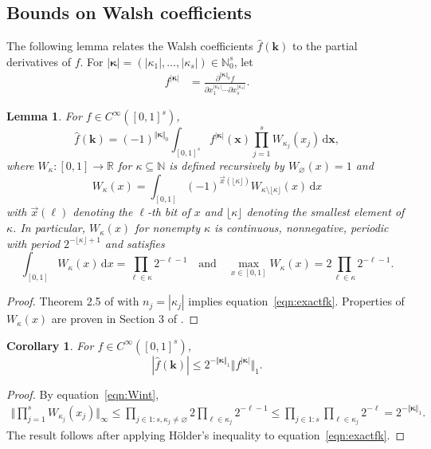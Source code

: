 \documentclass{article}
\newtheorem{lemma}{Lemma}
\newtheorem{corollary}{Corollary}
\theoremstyle{definition}
\renewcommand{\leq}{\leqslant}
\renewcommand{\emptyset}{\varnothing}
\newcommand{\natu}{\mathbb{N}}
\newcommand{\bsk}{\boldsymbol{k}}
\newcommand{\bsx}{\boldsymbol{x}}
\newcommand{\bskappa}{\boldsymbol{\kappa}}
\newcommand{\rd}{\,\mathrm{d}}
\begin{document}
\subsection{Bounds on Walsh coefficients}
The following lemma relates the Walsh coefficients $\hat{f}(\bsk)$ to the partial derivatives of $f$. For $|\bskappa|=(|\kappa_1|,\dots,|\kappa_s|)\in \natu^s_0$, let
\begin{align*}
f^{|\bskappa|}&=\frac{\partial^{\Vert\bskappa\Vert_0}f}{\partial x_1^{|\kappa_1|}\cdots\partial x_s^{|\kappa_s|}}.
\end{align*}
    \begin{lemma}\label{lem:exactfk}
For $f\in C^\infty([0,1]^s)$, 
\begin{equation}\label{eqn:exactfk}
\hat{f}(\bsk)=(-1)^{\Vert\bskappa\Vert_0}\int_{[0,1]^s}f^{|\bskappa|}(\bsx)\prod_{j=1}^s W_{\kappa_j}(x_j)\rd \bsx,
\end{equation} 
where $W_\kappa :[0,1]\to\mathbb{R}$ for $\kappa\subseteq \natu$ is defined recursively by $W_\emptyset(x)=1$ and  
\begin{equation*}
  W_{\kappa}(x)=\int_{[0,1]}(-1)^{\vec{x}(\lfloor\kappa\rfloor)}W_{\kappa\setminus \lfloor\kappa\rfloor}(x)\rd x  
\end{equation*}
with $\vec{x}(\ell)$ denoting the $\ell$-th bit of $x$ and $\lfloor\kappa\rfloor$ denoting the smallest element of $\kappa$. In particular, $W_\kappa(x)$ for nonempty $\kappa$  is continuous, nonnegative, periodic with period $2^{-\lfloor\kappa\rfloor+1}$ and satisfies
\begin{equation}\label{eqn:Wint}
\int_{[0,1]}W_\kappa(x)\rd x=\prod_{\ell\in\kappa}2^{-\ell-1}\quad \text{and} \quad \max_{x\in [0,1]} W_\kappa(x)= 2\prod_{\ell\in\kappa} 2^{-\ell-1}.
\end{equation}
\end{lemma}
\begin{proof}
Theorem 2.5 of \cite{SUZUKI20161} with $n_j=|\kappa_j|$ implies equation~\eqref{eqn:exactfk}. Properties of $W_\kappa(x)$ are proven in Section 3 of \cite{SUZUKI20161}.
\end{proof}

\begin{corollary}\label{cor:fkbound}
    For $f\in C^\infty([0,1]^s)$, 
    $$|\hat{f}(\bsk)|\leq 2^{-\Vert \bskappa \Vert_1} \Vert f^{|\bskappa|}\Vert_1 .$$
\end{corollary}
\begin{proof}
By equation~\eqref{eqn:Wint},
\begin{align*}
        \Big\Vert\prod_{j=1}^s W_{\kappa_j}(x_j)\Big\Vert_\infty \leq \prod_{j\in 1{:}s,\kappa_j\neq\emptyset} 2\prod_{\ell\in\kappa_j} 2^{-\ell-1}\leq \prod_{j\in 1{:}s} \prod_{\ell\in\kappa_j} 2^{-\ell}=2^{-\Vert \bskappa \Vert_1}.
    \end{align*}
    The result follows after applying  Hölder's inequality to equation~\eqref{eqn:exactfk}.
\end{proof}
\end{document}
